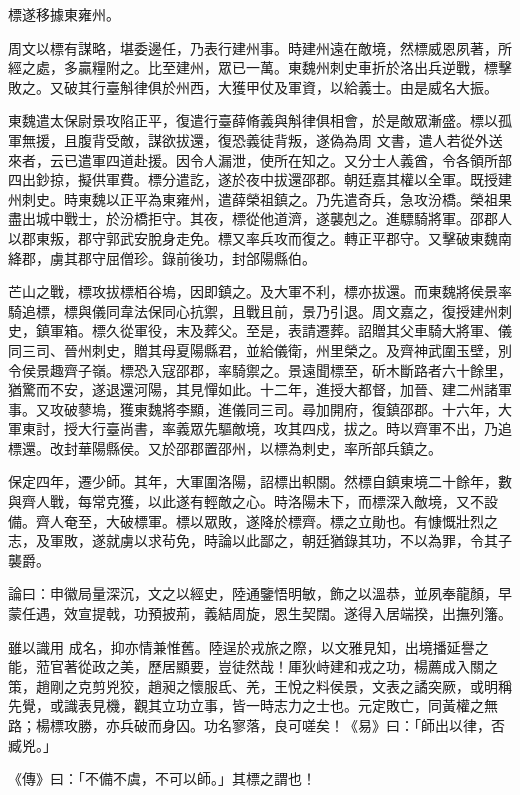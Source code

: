 \begin{pinyinscope}
 標遂移據東雍州。



 周文以標有謀略，堪委邊任，乃表行建州事。時建州遠在敵境，然標威恩夙著，所經之處，多贏糧附之。比至建州，眾已一萬。東魏州刺史車折於洛出兵逆戰，標擊敗之。又破其行臺斛律俱於州西，大獲甲仗及軍資，以給義士。由是威名大振。



 東魏遣太保尉景攻陷正平，復遣行臺薛脩義與斛律俱相會，於是敵眾漸盛。標以孤軍無援，且腹背受敵，謀欲拔還，復恐義徒背叛，遂偽為周
 文書，遣人若從外送來者，云已遣軍四道赴援。因令人漏泄，使所在知之。又分士人義酋，令各領所部四出鈔掠，擬供軍費。標分遣訖，遂於夜中拔還邵郡。朝廷嘉其權以全軍。既授建州刺史。時東魏以正平為東雍州，遣薛榮祖鎮之。乃先遣奇兵，急攻汾橋。榮祖果盡出城中戰士，於汾橋拒守。其夜，標從他道濟，遂襲剋之。進驃騎將軍。邵郡人以郡東叛，郡守郭武安脫身走免。標又率兵攻而復之。轉正平郡守。又擊破東魏南絳郡，虜其郡守屈僧珍。錄前後功，封郃陽縣伯。



 芒山之戰，標攻拔標栢谷塢，因即鎮之。及大軍不利，標亦拔還。而東魏將侯景率
 騎追標，標與儀同韋法保同心抗禦，且戰且前，景乃引退。周文嘉之，復授建州刺史，鎮軍箱。標久從軍役，末及葬父。至是，表請遷葬。詔贈其父車騎大將軍、儀同三司、晉州刺史，贈其母夏陽縣君，並給儀衛，州里榮之。及齊神武圍玉壁，別令侯景趣齊子嶺。標恐入寇邵郡，率騎禦之。景遠聞標至，斫木斷路者六十餘里，猶驚而不安，遂退還河陽，其見憚如此。十二年，進授大都督，加晉、建二州諸軍事。又攻破蓼塢，獲東魏將李顯，進儀同三司。尋加開府，復鎮邵郡。十六年，大軍東討，授大行臺尚書，率義眾先驅敵境，攻其四戍，拔之。時以齊軍不出，乃追
 標還。改封華陽縣侯。又於邵郡置邵州，以標為刺史，率所部兵鎮之。



 保定四年，遷少師。其年，大軍圍洛陽，詔標出軹關。然標自鎮東境二十餘年，數與齊人戰，每常克獲，以此遂有輕敵之心。時洛陽未下，而標深入敵境，又不設備。齊人奄至，大破標軍。標以眾敗，遂降於標齊。標之立勛也。有慷慨壯烈之志，及軍敗，遂就虜以求茍免，時論以此鄙之，朝廷猶錄其功，不以為罪，令其子襲爵。



 論曰：申徽局量深沉，文之以經史，陸通鑒悟明敏，飾之以溫恭，並夙奉龍顏，早蒙任遇，效宣提戟，功預披荊，義結周旋，恩生契闊。遂得入居端揆，出撫列籓。



 雖以識用
 成名，抑亦情兼惟舊。陸逞於戎旅之際，以文雅見知，出境播延譽之能，蒞官著從政之美，歷居顯要，豈徒然哉！厙狄峙建和戎之功，楊薦成入關之策，趙剛之克剪兇狡，趙昶之懷服氐、羌，王悅之料侯景，文表之譎突厥，或明稱先覺，或識表見機，觀其立功立事，皆一時志力之士也。元定敗亡，同黃權之無路；楊標攻勝，亦兵破而身囚。功名寥落，良可嗟矣！《易》曰：「師出以律，否臧兇。」



 《傳》曰：「不備不虞，不可以師。」其標之謂也！



\end{pinyinscope}